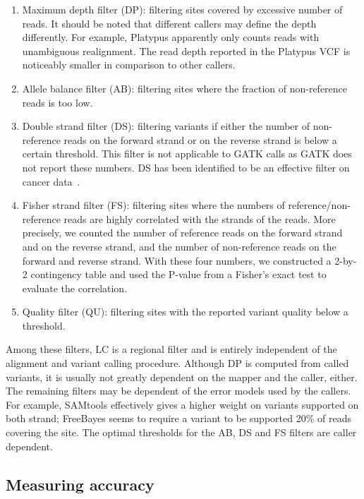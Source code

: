 \documentclass{bioinfo}
\begin{document}
\begin{methods}
\begin{enumerate}
\item Maximum depth filter (DP): filtering sites covered by excessive number of
reads. It should be noted that different callers may define the depth
differently. For example, Platypus apparently only counts reads with
unambiguous realignment. The read depth reported in the Platypus VCF is
noticeably smaller in comparison to other callers.

\item Allele balance filter (AB): filtering sites where the fraction of
non-reference reads is too low.

\item Double strand filter (DS): filtering variants if either the number of
non-reference reads on the forward strand or on the reverse strand is below a
certain threshold. This filter is not applicable to GATK calls as GATK does not
report these numbers. DS has been identified to be an effective filter on
cancer data~\citep{Roberts:2013aa,Kim:2013aa}.

\item Fisher strand filter (FS): filtering sites where the numbers of
reference/non-reference reads are highly correlated with the strands of the
reads. More precisely, we counted the number of reference reads on the forward
strand and on the reverse strand, and the number of non-reference reads on the
forward and reverse strand. With these four numbers, we constructed a 2-by-2
contingency table and used the P-value from a Fisher's exact test to evaluate
the correlation.

\item Quality filter (QU): filtering sites with the reported variant quality
below a threshold.

\end{enumerate}

Among these filters, LC is a regional filter and is entirely independent of the
alignment and variant calling procedure. Although DP is computed from called
variants, it is usually not greatly dependent on the mapper and the caller,
either. The remaining filters may be dependent of the error models used by the
callers. For example, SAMtools effectively gives a higher weight on variants
supported on both strand; FreeBayes seems to require a variant to be supported
20\% of reads covering the site. The optimal thresholds for the AB, DS and FS
filters are caller dependent.

\subsection{Measuring accuracy}


\end{methods}
\end{document}
